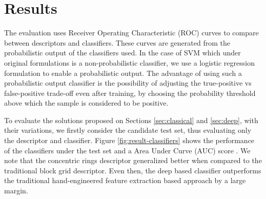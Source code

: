 \begin{figure*}[!t]
\centering
{}%
\hfil
{}%

%
\hfil
{}%

%
\hfil
{}%
\caption{Dataset examples. Images in first column are RGB and on the right are corresponding depth images. The bounding boxes in the images are obtained by the candidate detection algorithm.}
\label{fig:dataset}
\end{figure*}


\section{Results}
\label{sec:results}

    The evaluation uses Receiver Operating Characteristic (ROC) curves \cite{evaluationMetrics} to compare between descriptors and classifiers. These curves are generated from the probabilistic output of the classifiers used. In the case of SVM which under original formulations is a non-probabilistic classifier, we use a logistic regression formulation \cite{svmProbabilisticOutput} to enable a probabilistic output. The advantage of using such a probabilistic output classifier is the possibility of adjusting the true-positive vs false-positive trade-off even after training, by choosing the probability threshold above which the sample is considered to be positive.

    To evaluate the solutions proposed on Sections \ref{sec:classical} and \ref{sec:deep}, with their variations, we firstly consider the candidate test set, thus evaluating only the descriptor and classifier. Figure \ref{fig:result-classifiers} shows the performance of the classifiers under the test set and a Area Under Curve (AUC) score \cite{evaluationMetrics}. We note that the concentric rings descriptor generalized better when compared to the traditional block grid descriptor. Even then, the deep based classifier outperforms the traditional hand-engineered feature extraction based approach by a large margin.


    \begin{figure*}[!t]
    \centering
    \label{fig:result-classifiers-all}
    \hfil
    \caption{Classifiers performance. The AUC score for each classifier was, respectively, 0.9785, 0.7019 and 0.8745.}
    \label{fig:result-classifiers}
    \end{figure*}


